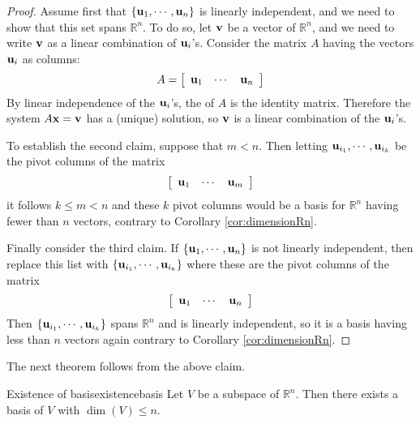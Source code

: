 \begin{proof}
Assume first that $\left\{ {\bf u}_{1},\cdots ,{\bf u}_{n}\right\} $
is linearly independent, and we need to show that this set spans
$\mathbb{R}^{n}$. To do so, let ${\bf v}$ be a vector of
$\mathbb{R}^{n}$, and we need to write ${\bf v}$ as a linear combination of ${\bf u}_i$'s. 
Consider the matrix $A$ having the vectors ${\bf u}_i$  as
columns:
\begin{equation*}
A = 
\left[
\begin{array}{rrr}
{\bf u}_{1} & \cdots & {\bf u}_{n} 
\end{array}
\right]
\end{equation*}
By linear independence of the ${\bf u}_i$'s, the {\rref} of $A$ is
the identity matrix.  Therefore the system $A{\bf x}=
{\bf v}$ has a (unique) solution, so ${\bf v}$ is a linear combination
of the ${\bf u}_i$'s.

To establish the second claim, suppose that $m<n.$ Then letting
${\bf u}_{i_{1}},\cdots ,{\bf u}_{i_{k}}$ be the pivot columns of the
matrix
\begin{equation*}
\left[
\begin{array}{ccc}
{\bf u}_{1} & \cdots & {\bf u}_{m}
\end{array}
\right]
\end{equation*}
it follows $k\leq m<n$ and these $k$ pivot columns would be a basis
for $\mathbb{R}^{n}$ having fewer than $n$ vectors, contrary to
Corollary \ref{cor:dimensionRn}.

Finally consider the third claim. If $\left\{ {\bf u}_{1},\cdots
,{\bf u}_{n}\right\} $ is not linearly independent, then replace this
list with $\left\{ {\bf u}_{i_{1}},\cdots ,{\bf u}_{i_{k}}\right\} $ where these
are the pivot columns of the matrix 
\begin{equation*}
\left[
\begin{array}{ccc}
{\bf u}_{1} & \cdots & {\bf u}_{n}
\end{array}
\right]
\end{equation*}
Then $\left\{ {\bf u}_{i_{1}},\cdots ,{\bf u}_{i_{k}}\right\} $ spans
$\mathbb{R}^{n}$ and is linearly independent, so it is a basis having
less than $n$ vectors again contrary to Corollary \ref{cor:dimensionRn}.
\end{proof}

The next theorem follows from the above claim.

\begin{theorem}{Existence of basis}{existencebasis}
Let $V$ be a subspace of $\mathbb{R}^n$. Then there exists a basis of $V$ with 
 $\dim(V)\leq n$.
\end{theorem}

